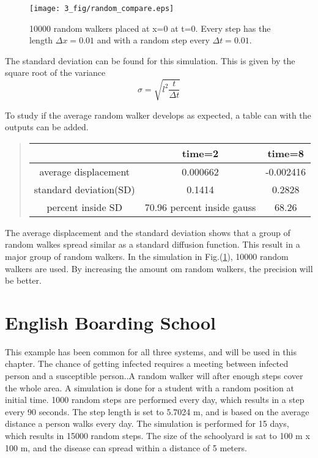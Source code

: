 \documentclass[%
twoside,                 %
final,                   %
chapterprefix=true,      %
open=right               %
10pt]{book}
\begin{document}
\begin{figure}[ht]
  \centerline{\texttt{[image: 3\_fig/random\_compare.eps]}}
  \caption{
  \label{fig:gauss_random} 10000 random walkers placed at x=0 at t=0. Every step has the length $\Delta x = 0.01$ and with a random step every $\Delta t = 0.01$.
  }
\end{figure}


The standard deviation can be found for this simulation. This is given by the square root of the variance
\begin{equation}
\sigma = \sqrt{l^2\frac{t}{\Delta t}}
\end{equation}

To study if the average random walker develops as expected, a table can with the outputs can be added. 

\label{table:gauss_random}

\begin{quote}
\begin{tabular}{ccc}
\hline
\multicolumn{1}{c}{  } & \multicolumn{1}{c}{ time=2 } & \multicolumn{1}{c}{ time=8 } \\
\hline
average displacement   & 0.000662               & -0.002416              \\
standard deviation(SD) & 0.1414                 & 0.2828                 \\
percent inside SD      & 70.96 %
percent inside gauss   & 68.26 %
\hline
\end{tabular}
\end{quote}

\noindent
The average displacement and the standard deviation shows that a group of random walkes spread similar as a standard diffusion function. This result in a major group of random walkers. In the simulation in Fig.(\ref{fig:gauss_random}), 10000 random walkers are used. By increasing the amount om random walkers, the precision will be better.

\section{English Boarding School}
This example has been common for all three systems, and will be used in this chapter. The chance of getting infected requires a meeting between  infected person and a susceptible person..A random walker will after enough steps cover the whole area. A simulation is done for a student with a random position at initial time. 1000 random steps are performed every day, which results in a step every 90 seconds. The step length is set to 5.7024 m, and is based on the average distance a person walks every day. The simulation is performed for 15 days, which results in 15000 random steps. The size of the schoolyard is sat to 100 m x 100 m, and the disease can spread within a distance of 5 meters.
\end{document}
